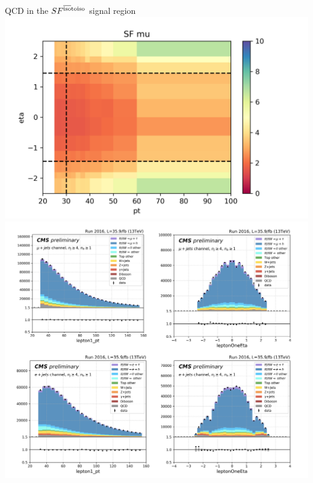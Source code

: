 \begin{frame}{}
    \begin{exampleblock}{QCD in the \cmh}
    \hspace{0.12\textwidth} $SF^{\rm \overline{iso} \to iso}$ \hspace{0.3\textwidth} signal region \\
    \centering
        \includegraphics[height=0.32\textheight]{chapters/Analysis/sectionBackground/figures/ljets_kinematics/123j1b/SF_mu_2d.png}
        \includegraphics[height=0.32\textheight, trim=0 11cm 0 0, clip]{chapters/Analysis/sectionBackground/figures/ljets_application/mcNorm_ddShape.png}
    \end{exampleblock}
    

\end{frame}
